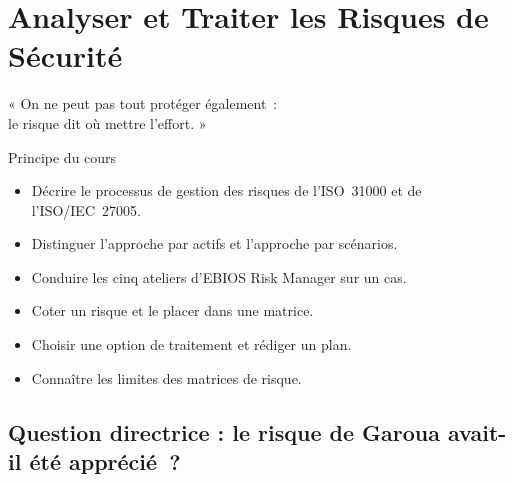 
\chapter{Analyser et Traiter les Risques de Sécurité}
\label{chap:risques}

\epigraph{%
    « On ne peut pas tout protéger également~:\\
    le risque dit où mettre l'effort. »%
}{Principe du cours}


\begin{boxobjectifs}
\begin{itemize}
    \item Décrire le processus de gestion des risques de l'ISO~31000 et
          de l'ISO/IEC~27005.
    \item Distinguer l'approche par actifs et l'approche par scénarios.
    \item Conduire les cinq ateliers d'EBIOS Risk Manager sur un cas.
    \item Coter un risque et le placer dans une matrice.
    \item Choisir une option de traitement et rédiger un plan.
    \item Connaître les limites des matrices de risque.
\end{itemize}
\end{boxobjectifs}

\bigskip

\section*{Question directrice : le risque de Garoua avait-il été apprécié~?}

